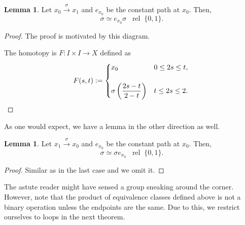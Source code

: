 \documentclass[12pt]{article}
\theoremstyle{definition}
\numberwithin{thm}{section}
\newtheorem{lem}[thm]{Lemma}
\newcommand{\rel}{\;\;\operatorname{rel}\;}
\begin{document}
\begin{lem} \label{lem:leftid}
	Let $x_0 \overset{\sigma}{\longrightarrow} x_1$ and $e_{x_0}$ be the constant path at $x_0.$ Then,
	\begin{equation*} 
		\sigma \simeq e_{x_0}\sigma \rel \{0, 1\}.
	\end{equation*}
\end{lem}
\begin{proof} 
	The proof is motivated by this diagram.

	\begin{center}
	\end{center}

	The homotopy is $F:I\times I \to X$ defined as
	\begin{equation*} 
		F(s, t) \vcentcolon= \begin{cases}
			x_0 & 0 \le 2s \le t,\\~\\
			\sigma\left(\dfrac{2s - t}{2 - t}\right) & t \le 2s \le 2.
		\end{cases}
		\qedhere
	\end{equation*}
\end{proof}

As one would expect, we have a lemma in the other direction as well.
\begin{lem} \label{lem:rightid}
	Let $x_1 \overset{\sigma}{\longrightarrow} x_0$ and $e_{x_0}$ be the constant path at $x_0.$ Then,
	\begin{equation*} 
		\sigma \simeq \sigma e_{x_0} \rel \{0, 1\}.
	\end{equation*}
\end{lem}

\begin{proof} 
	Similar as in the last case and we omit it.
\end{proof}
	
The astute reader might have sensed a group sneaking around the corner.\\
However, note that the product of equivalence classes defined above is not a binary operation unless the endpoints are the same. Due to this, we restrict ourselves to loops in the next theorem.
\end{document}
